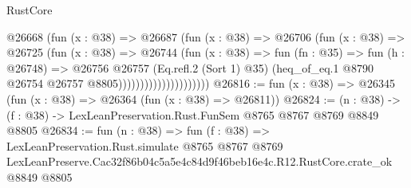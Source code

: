 \begin{lexlean}{RustCore}
\begin{coremodule}
                                @26668
                                  (fun (x : @38) =>
                                  @26687
                                    (fun (x : @38) =>
                                    @26706
                                      (fun (x : @38) =>
                                      @26725
                                        (fun (x : @38) =>
                                        @26744
                                          (fun (x : @38) =>
                                          fun (fn : @35) =>
                                          fun (h : @26748) =>
                                          @26756
                                            @26757
                                            (Eq.refl.{2} (Sort 1) @35)
                                            (heq_of_eq.{1}
                                              @8790
                                              @26754
                                              @26757
                                              @8805)))))))))))))))))))))
@26816 := fun (x : @38) => @26345 (fun (x : @38) => @26364 (fun (x : @38) => @26811))
@26824 := (n : @38) -> (f : @38) -> LexLeanPreservation.Rust.FunSem @8765 @8767 @8769 @8849 @8805
@26834 := fun (n : @38) =>
  fun (f : @38) =>
  LexLeanPreservation.Rust.simulate
    @8765
    @8767
    @8769
    LexLeanPreserve.Cac32f86b04c5a5e4c84d9f46beb16e4c.R12.RustCore.crate_ok
    @8849
    @8805
\end{coremodule}
\end{lexlean}
